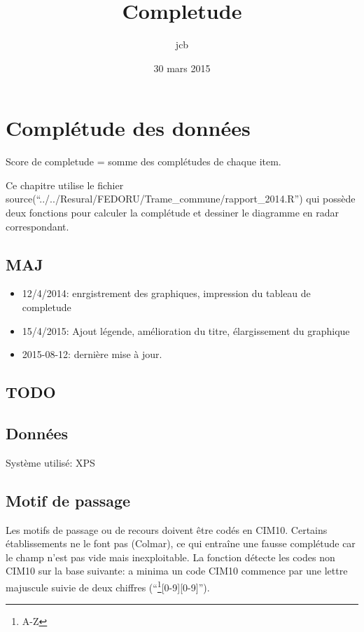 \documentclass[]{article}
\title{Completude}
\author{jcb}
\date{30 mars 2015}
\let\rmarkdownfootnote\footnote%
\def\footnote{\protect\rmarkdownfootnote}
\begin{document}
\maketitle


{
\hypersetup{linkcolor=black}
\setcounter{tocdepth}{2}
\tableofcontents
}
\section{Complétude des données}\label{completude-des-donnees}

Score de completude = somme des complétudes de chaque item.

Ce chapitre utilise le fichier
source(``../../Resural/FEDORU/Trame\_commune/rapport\_2014.R'') qui
possède deux fonctions pour calculer la complétude et dessiner le
diagramme en radar correspondant.

\subsection{MAJ}\label{maj}

\begin{itemize}
\itemsep1pt\parskip0pt
\item
  12/4/2014: enrgistrement des graphiques, impression du tableau de
  completude
\item
  15/4/2015: Ajout légende, amélioration du titre, élargissement du
  graphique
\item
  2015-08-12: dernière mise à jour.
\end{itemize}

\subsection{TODO}\label{todo}

\subsection{Données}\label{donnees}

Système utilisé: XPS

\subsection{Motif de passage}\label{motif-de-passage}

Les motifs de passage ou de recours doivent être codés en CIM10.
Certains établissements ne le font pas (Colmar), ce qui entraîne une
fausse complétude car le champ n'est pas vide mais inexploitable. La
fonction détecte les codes non CIM10 sur la base suivante: a minima un
code CIM10 commence par une lettre majuscule suivie de deux chiffres
(``\footnote{A-Z}{[}0-9{]}{[}0-9{]}'').
\end{document}
